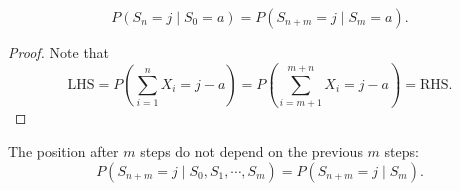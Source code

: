 \documentclass[11pt,singlecolumn, openany, citestyle=authoryear]{elegantbook}
\begin{document}
\begin{CJK}{UTF8}{gbsn}
\begin{lemma}
    \begin{equation}
        P(S_n=j\mid S_0 = a)=P(S_{n+m} = j\mid S_m=a).
    \end{equation}
\end{lemma}
\begin{proof}
    Note that 
    $$
    \text{LHS} = P(\sum_{i=1}^n X_i = j-a) = 
    P(\sum_{i=m+1}^{m+n}X_i = j-a)=\text{RHS}.
    $$
\end{proof}

\begin{proposition}
    The position after $m$ steps do not depend on the previous $m$ steps:
    $$
    P(S_{n+m}=j \mid S_0,S_1,\cdots,S_m)=P(S_{n+m}=j\mid S_m).
    $$
\end{proposition}


\end{CJK}
\end{document}
